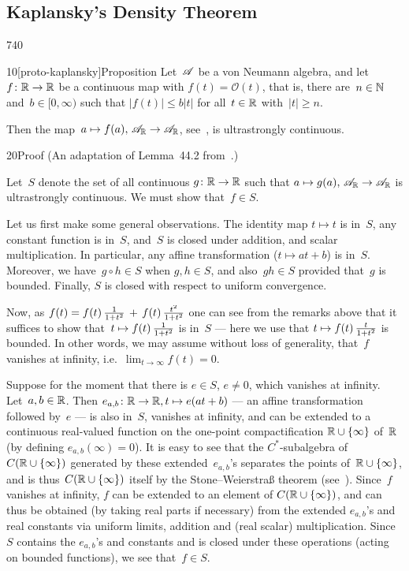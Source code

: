 \subsection{Kaplansky's Density Theorem}
\begin{parsec}{740}%
\begin{point}{10}[proto-kaplansky]{Proposition}%
Let~$\mathscr{A}$ be a von Neumann algebra,
and let~$f\colon \mathbb{R}\to\mathbb{R}$ be a continuous map 
with $f(t)=\mathcal{O}(t)$,
that is,
there are~$n\in \mathbb{N}$ and~$b\in [0,\infty)$
such that $\left|f(t)\right|\leq b\left|t\right|$
for all~$t\in \mathbb{R}$ with~$\left|t\right| \geq n$.

Then the map~$a\mapsto f(a),\,\mathscr{A}_{\mathbb{R}}\to\mathscr{A}_{\mathbb{R}}$,
see~,
is ultrastrongly continuous.
\begin{point}{20}{Proof}%
(An adaptation of Lemma~44.2 from~\cite{conway2000}.)

Let~$S$ denote the set of all continuous $g\colon \mathbb{R}\to\mathbb{R}$
such that $a\mapsto g(a),\,\mathscr{A}_{\mathbb{R}}\to\mathscr{A}_{\mathbb{R}}$
is ultrastrongly continuous.
We must show that~$f\in S$.

Let us first make some general observations.
The identity map $t\mapsto t$ is in~$S$,
any constant function is in~$S$,
and~$S$ is closed under addition,
and scalar multiplication.
In particular, any affine transformation ($t\mapsto at+b$)
is in~$S$.
Moreover, we have~$g\circ h\in S$ when $g,h\in S$,
and also~$gh\in S$
provided that~$g$ is bounded.
Finally, $S$ is closed with respect to uniform convergence.

Now,
as $f(t)=f(t)\,\smash{\frac{1}{1+t^2}\,+\, f(t)\,\frac{t^2}{1+t^2}}$
 one can see from the remarks above
that it suffices
to show
that~$t\mapsto f(t)\,\smash{\frac{1}{1+t^2}}$ is in~$S$
--- here we use that $t\mapsto f(t) \,\smash{\frac{t}{1+t^2}}$ is bounded.
In other words,
we may assume without loss of generality,
that~$f$ vanishes at infinity, i.e.~$\lim_{t\to \infty}f(t)=0$.

Suppose for the moment
that there is $e\in S$, $e\neq 0$,
which vanishes at infinity.
Let~$a,b\in \mathbb{R}$.
Then $e_{a,b}\colon \mathbb{R}\to\mathbb{R}, t\mapsto e(at+b)$
--- an affine transformation followed by~$e$ ---
is also in~$S$,
vanishes at infinity,
and can be extended to a continuous real-valued
function on the one-point compactification $\mathbb{R}\cup \{ \infty\}$
of~$\mathbb{R}$
(by defining $e_{a,b}(\infty)=0$).
It is easy to see that the $C^*$-subalgebra
of~$C(\mathbb{R}\cup\{\infty\})$
generated by these extended~$e_{a,b}$'s 
separates the points of~$\mathbb{R}\cup\{\infty\}$,
and is thus~$C(\mathbb{R}\cup\{\infty\})$ itself
    by the Stone--Weierstra\ss{} theorem (see~).
Since~$f$ vanishes at infinity,
$f$ can be extended to an element of $C(\mathbb{R}\cup\{\infty\})$,
 and can thus be obtained
(by taking real parts if necessary)
from the extended $e_{a,b}$'s and real constants 
via uniform limits, addition and (real scalar)
multiplication. 
Since~$S$ contains the $e_{a,b}$'s and constants
and is closed under these operations (acting on bounded functions),
we see that~$f\in S$.


\end{point}
\end{point}
\end{parsec}
